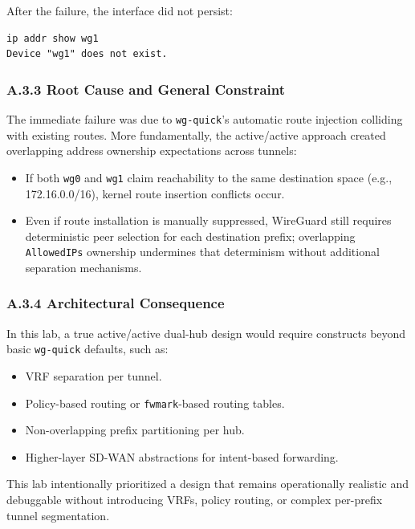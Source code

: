 \documentclass[11pt]{article}
\begin{document}
After the failure, the interface did not persist:

\begin{verbatim}
ip addr show wg1
Device "wg1" does not exist.
\end{verbatim}

\subsubsection{A.3.3 Root Cause and General Constraint}
\label{subsubsec:a3-root-cause}

The immediate failure was due to \texttt{wg-quick}'s automatic route injection colliding with existing routes. More fundamentally, the active/active approach created overlapping address ownership expectations across tunnels:

\begin{itemize}
  \item If both \texttt{wg0} and \texttt{wg1} claim reachability to the same destination space (e.g., 172.16.0.0/16), kernel route insertion conflicts occur.
  \item Even if route installation is manually suppressed, WireGuard still requires deterministic peer selection for each destination prefix; overlapping \texttt{AllowedIPs} ownership undermines that determinism without additional separation mechanisms.
\end{itemize}

\subsubsection{A.3.4 Architectural Consequence}
\label{subsubsec:a3-architectural-consequence}

In this lab, a true active/active dual-hub design would require constructs beyond basic \texttt{wg-quick} defaults, such as:
\begin{itemize}
  \item VRF separation per tunnel.
  \item Policy-based routing or \texttt{fwmark}-based routing tables.
  \item Non-overlapping prefix partitioning per hub.
  \item Higher-layer SD-WAN abstractions for intent-based forwarding.
\end{itemize}

This lab intentionally prioritized a design that remains operationally realistic and debuggable without introducing VRFs, policy routing, or complex per-prefix tunnel segmentation.
\end{document}

